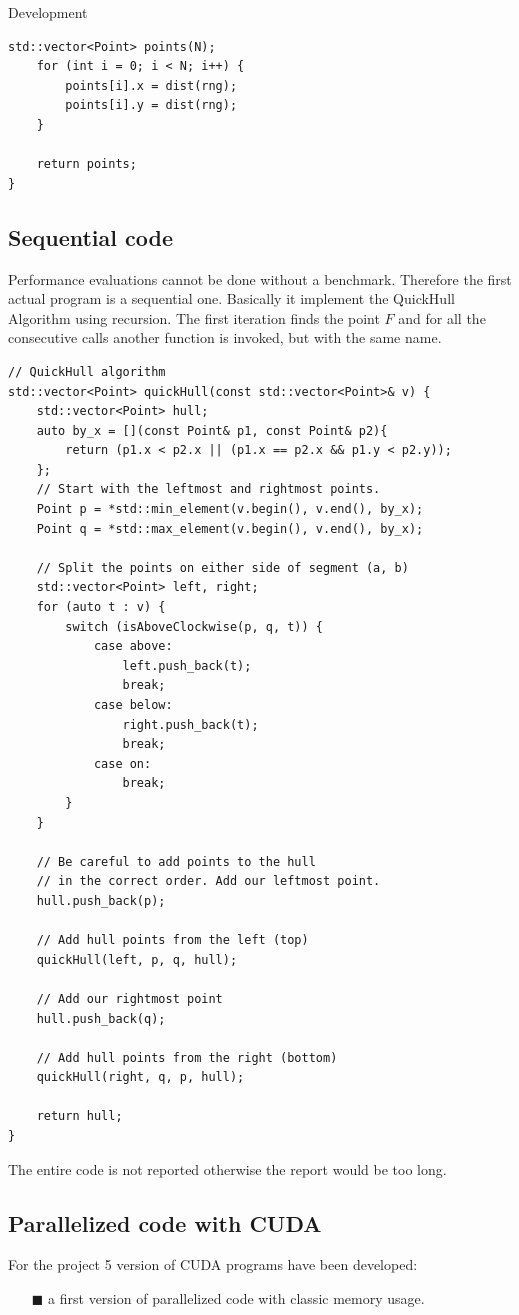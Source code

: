 \documentclass[a4paper,oneside,11pt,DIV12,headsepline,footexclude,headexclude]{scrartcl}
\begin{document}
\begin{section}{Development}
\begin{lstlisting}[caption={Random points generator.}, captionpos=b]
    std::vector<Point> points(N);
    for (int i = 0; i < N; i++) {
        points[i].x = dist(rng);
        points[i].y = dist(rng);
    }

    return points;
}

\end{lstlisting}
\subsection{Sequential code}
Performance evaluations cannot be done without a benchmark. Therefore the first actual program is a sequential one. Basically it implement the QuickHull Algorithm using recursion. The first iteration finds the point \(F\) and for all the consecutive calls another function is invoked, but with the same name. 
\lstset{language=C++}
\begin{lstlisting}[caption={Function in sequential program.}, captionpos=b]
// QuickHull algorithm
std::vector<Point> quickHull(const std::vector<Point>& v) {
    std::vector<Point> hull;
    auto by_x = [](const Point& p1, const Point& p2){
        return (p1.x < p2.x || (p1.x == p2.x && p1.y < p2.y));
    };
    // Start with the leftmost and rightmost points.
    Point p = *std::min_element(v.begin(), v.end(), by_x);
    Point q = *std::max_element(v.begin(), v.end(), by_x);

    // Split the points on either side of segment (a, b)
    std::vector<Point> left, right;
    for (auto t : v) {
        switch (isAboveClockwise(p, q, t)) {
            case above:
                left.push_back(t);
                break;
            case below:
                right.push_back(t);
                break;
            case on:
                break;
        }
    }

    // Be careful to add points to the hull
    // in the correct order. Add our leftmost point.
    hull.push_back(p);

    // Add hull points from the left (top)
    quickHull(left, p, q, hull);

    // Add our rightmost point
    hull.push_back(q);

    // Add hull points from the right (bottom)
    quickHull(right, q, p, hull);

    return hull;
}
\end{lstlisting}
The entire code is not reported otherwise the report would be too long.
\subsection{Parallelized code with CUDA}
For the project 5 version of CUDA programs have been developed:
\begin{enumerate}
    \item[$\blacksquare$] a first version of parallelized code with classic memory usage.


\end{enumerate}
\end{section}
\end{document}

